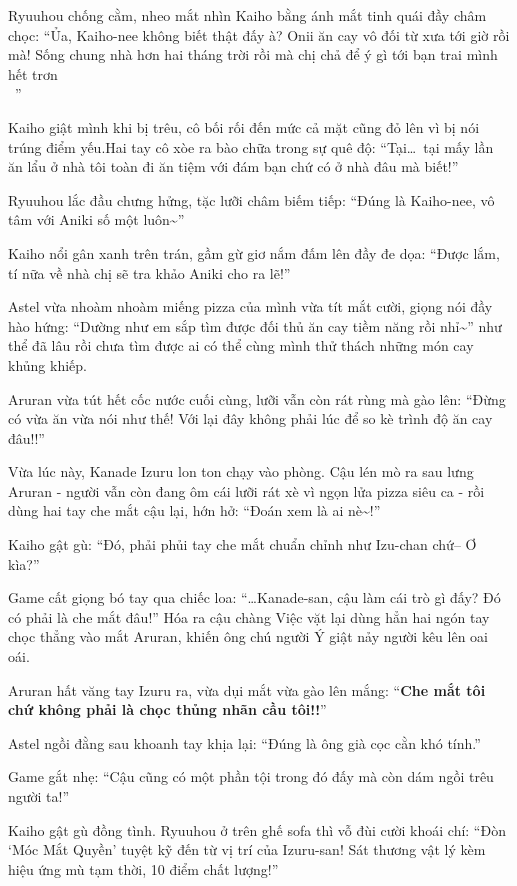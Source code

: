 \documentclass[../main.tex]{subfiles}
\begin{document}
Ryuuhou chống cằm, nheo mắt nhìn Kaiho bằng ánh mắt tinh quái đầy châm chọc: ``Ủa, Kaiho-nee không biết thật đấy à? Onii ăn cay vô đối từ xưa tới giờ rồi mà! Sống chung nhà hơn hai tháng trời rồi mà chị chả để ý gì tới bạn trai mình hết trơn\\~{}{}''

Kaiho giật mình khi bị trêu, cô bối rối đến mức cả mặt cũng đỏ lên vì bị nói trúng điểm yếu.Hai tay cô xòe ra bào chữa trong sự quê độ: ``Tại\dots\ tại mấy lần ăn lẩu ở nhà tôi toàn đi ăn tiệm với đám bạn chứ có ở nhà đâu mà biết!''

Ryuuhou lắc đầu chưng hửng, tặc lưỡi châm biếm tiếp: ``Đúng là Kaiho-nee, vô tâm với Aniki số một luôn\~{}''

Kaiho nổi gân xanh trên trán, gầm gừ giơ nắm đấm lên đầy đe dọa: ``Được lắm, tí nữa về nhà chị sẽ tra khảo Aniki cho ra lẽ!''

Astel vừa nhoàm nhoàm miếng pizza của mình vừa tít mắt cười, giọng nói đầy hào hứng: ``Dường như em sắp tìm được đối thủ ăn cay tiềm năng rồi nhỉ\~{}'' như thể đã lâu rồi chưa tìm được ai có thể cùng mình thử thách những món cay khủng khiếp.

Aruran vừa tút hết cốc nước cuối cùng, lưỡi vẫn còn rát rùng mà gào lên: ``Đừng có vừa ăn vừa nói như thế! Với lại đây không phải lúc để so kè trình độ ăn cay đâu!!''

\ct

Vừa lúc này, Kanade Izuru lon ton chạy vào phòng. Cậu lén mò ra sau lưng Aruran - người vẫn còn đang ôm cái lưỡi rát xè vì ngọn lửa pizza siêu ca - rồi dùng hai tay che mắt cậu lại, hớn hở: ``Đoán xem là ai nè\~{}!''

Kaiho gật gù: ``Đó, phải phủi tay che mắt chuẩn chỉnh như Izu-chan chứ-- Ơ kìa?''

Game cất giọng bó tay qua chiếc loa: ``\dots Kanade-san, cậu làm cái trò gì đấy? Đó có phải là che mắt đâu!'' Hóa ra cậu chàng Việc vặt lại dùng hẳn hai ngón tay chọc thẳng vào mắt Aruran, khiến ông chú người Ý giật nảy người kêu lên oai oái.


Aruran hất văng tay Izuru ra, vừa dụi mắt vừa gào lên mắng: ``\textbf{Che mắt tôi chứ không phải là chọc thủng nhãn cầu tôi!!}''

Astel ngồi đằng sau khoanh tay khịa lại: ``Đúng là ông già cọc cằn khó tính.''

Game gắt nhẹ: ``Cậu cũng có một phần tội trong đó đấy mà còn dám ngồi trêu người ta!''

Kaiho gật gù đồng tình. Ryuuhou ở trên ghế sofa thì vỗ đùi cười khoái chí: ``Đòn `Móc Mắt Quyền' tuyệt kỹ đến từ vị trí của Izuru-san! Sát thương vật lý kèm hiệu ứng mù tạm thời, 10 điểm chất lượng!''
\end{document}
